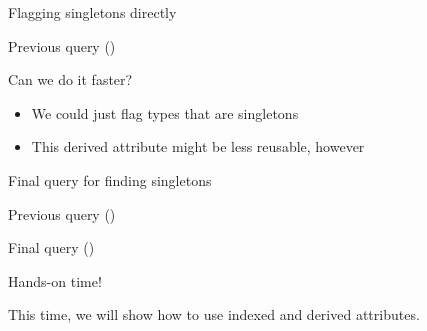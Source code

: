 \begin{frame}[fragile]{Flagging singletons directly}
  \begin{block}{Previous query ()}
    
  \end{block}

  \begin{block}{Can we do it faster?}
    \begin{itemize}
    \item We could just flag types that are singletons
    \item This derived attribute might be less reusable, however
    \end{itemize}
  \end{block}
\end{frame}

\begin{frame}[fragile]{Final query for finding singletons}
  \begin{block}{Previous query ()}
    
  \end{block}

  \begin{block}{Final query ()}
    
  \end{block}
\end{frame}

\begin{frame}[standout]
  Hands-on time!

  This time, we will show how to use indexed and derived attributes.
\end{frame}

